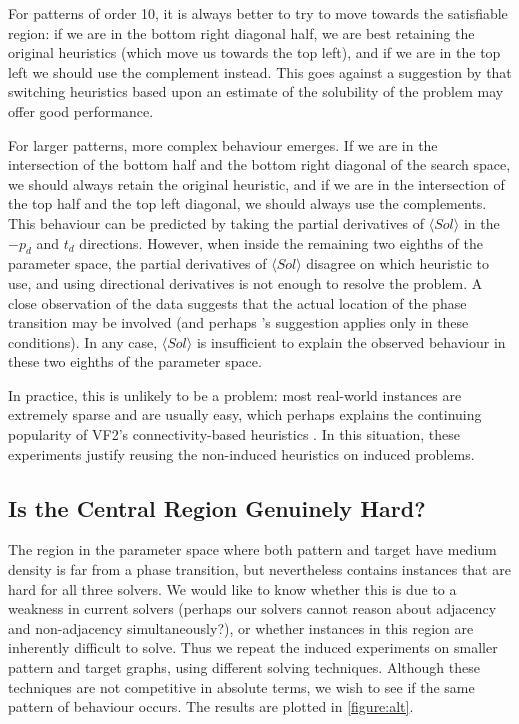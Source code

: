 \documentclass[letterpaper]{article}
\newcommand{\citet}[1]{\citeauthor{#1} \shortcite{#1}}
\newcommand{\citep}[1]{\cite{#1}}
\begin{document}
For patterns of order 10, it is always better to try to move towards the satisfiable region: if we
are in the bottom right diagonal half, we are best retaining the original heuristics (which move us
towards the top left), and if we are in the top left we should use the complement instead. This
goes against a suggestion by \citet{Walsh:1998} that switching heuristics based upon an estimate of
the solubility of the problem may offer good performance.

For larger patterns, more complex behaviour emerges. If we are in the intersection of the bottom half
and the bottom right diagonal of the search space, we should always retain the original heuristic,
and if we are in the intersection of the top half and the top left diagonal, we should always use
the complements. This behaviour can be predicted by taking the partial derivatives of $\langle Sol
\rangle$ in the $-p_d$ and $t_d$ directions.  However, when inside the remaining two eighths of the
parameter space, the partial derivatives of $\langle Sol \rangle$ disagree on which heuristic to
use, and using directional derivatives is not enough to resolve the problem. A close observation of
the data suggests that the actual location of the phase transition may be involved (and perhaps
\citeauthor{Walsh:1998}'s suggestion applies only in these conditions). In any case, $\langle Sol
\rangle$ is insufficient to explain the observed behaviour in these two eighths of the parameter space.

In practice, this is unlikely to be a problem: most real-world instances are extremely sparse and
are usually easy, which perhaps explains the continuing popularity of VF2's connectivity-based
heuristics \citep{Carletti:2015}. In this situation, these experiments justify reusing the
non-induced heuristics on induced problems.

\subsection{Is the Central Region Genuinely Hard?}

The region in the parameter space where both pattern and target have medium density is far from a
phase transition, but nevertheless contains instances that are hard for all three solvers. We would
like to know whether this is due to a weakness in current solvers (perhaps our solvers cannot reason
about adjacency and non-adjacency simultaneously?), or whether instances in this region are
inherently difficult to solve.  Thus we repeat the induced experiments on smaller pattern and target
graphs, using different solving techniques.  Although these techniques are not competitive in
absolute terms, we wish to see if the same pattern of behaviour occurs. The results are plotted in
\cref{figure:alt}.
\end{document}
